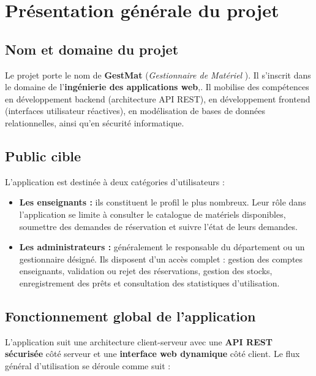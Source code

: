 \documentclass[12pt,a4paper]{report}
\begin{document}
\chapter{Pr\'esentation g\'en\'erale du projet}

\section{Nom et domaine du projet}

Le projet porte le nom de \textbf{GestMat}
(\textit{Gestionnaire de Mat\'eriel }). Il s'inscrit dans le domaine de
l'\textbf{ing\'enierie des applications web},. Il mobilise des comp\'etences en d\'eveloppement
backend (architecture API REST), en d\'eveloppement frontend (interfaces
utilisateur r\'eactives), en mod\'elisation de bases de donn\'ees
relationnelles, ainsi qu'en s\'ecurit\'e informatique.

\section{Public cible}

L'application est destin\'ee \`a deux cat\'egories d'utilisateurs :

\begin{itemize}
  \item \textbf{Les enseignants :} ils constituent le profil le plus
        nombreux. Leur r\^ole dans l'application se limite \`a consulter
        le catalogue de mat\'eriels disponibles, soumettre des demandes
        de r\'eservation et suivre l'\'etat de leurs demandes.
  \item \textbf{Les administrateurs :} g\'en\'eralement le responsable
        du d\'epartement ou un gestionnaire d\'esign\'e. Ils disposent
        d'un acc\`es complet : gestion des comptes enseignants, validation
        ou rejet des r\'eservations, gestion des stocks, enregistrement
        des pr\^ets et consultation des statistiques d'utilisation.
\end{itemize}

\section{Fonctionnement global de l'application}

L'application suit une architecture client-serveur avec une
\textbf{API REST s\'ecuris\'ee} c\^ot\'e serveur et une
\textbf{interface web dynamique} c\^ot\'e client.
Le flux g\'en\'eral d'utilisation se d\'eroule comme suit :
\end{document}
